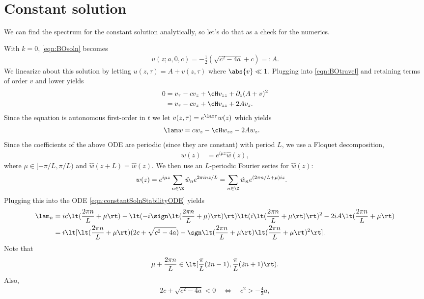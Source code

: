 \documentclass[a4paper,10pt]{article}
\begin{document}
\section{Constant solution}
We can find the spectrum for the constant solution analytically, so let's do
that as a check for the numerics.

With $k=0$, \eqref{eqn:BOsoln} becomes
\begin{align}
  u(z; a,0,c) = -\frac12 (\sqrt{c^2-4a}+c) =: A.
\end{align}
We linearize about this solution by letting $u(z,\tau)= A + v(z,\tau)$ where
$\abs{v}\ll1$. Plugging into \eqref{eqn:BOtravel} and retaining terms of order
$v$ and lower yields
\begin{align}
  0 &= v_\tau -c v_z + \cH v_{zz} + \partial_z(A+v)^2\\
  &= v_\tau -cv_z + \cH v_{zz} + 2A v_z.
\end{align}
Since the equation is autonomous first-order in $t$ we let $v(z,\tau) = e^{\lam
\tau}w(z)$ which yields
\begin{align}
  \lam w &= c w_z -\cH w_{zz} - 2 A w_z.\label{eqn:constantSolnStabilityODE}
\end{align}
Since the coefficients of the above ODE are periodic (since they are constant)
with period $L$, we use a Floquet decomposition,
\begin{align}
  w(z) &= e^{i\mu z}\hat w(z) ,
\end{align}
where $\mu \in [-\pi/L, \pi/L)$ and $\hat w(z+L) = \hat w(z)$. We then use an
  $L$-periodic Fourier series for $\hat w(z)$:
\begin{align}
  w(z) &= e^{i\mu z} \sum_{n\in \Z} \hat w_n e^{2\pi i n z/L} = \sum_{n\in
  \Z}\hat w_n e^{(2\pi n/L + \mu)iz}.
\end{align}
Plugging this into the ODE \eqref{eqn:constantSolnStabilityODE} yields
\begin{align}
  \lam_n &= ic \lt(\frac{2\pi n}{L} + \mu\rt) - \lt(-i\sign\lt(\frac{2\pi
  n}{L}+\mu)\rt)\rt)\lt(i\lt(\frac{2\pi n}{L}+\mu\rt)\rt)^2 - 2iA \lt(\frac{2\pi
  n}{L}+\mu\rt)\\
  &= i\lt[ \lt(\frac{2\pi n}{L}+\mu\rt)(2c + \sqrt{c^2-4a}) - \sgn\lt(\frac{2\pi
  n}{L}+\mu\rt)\lt(\frac{2\pi n}{L}+\mu\rt)^2\rt].
\end{align}
Note that
\begin{align}
  \mu + \frac{2\pi n}{L} \in \lt[\frac \pi L (2n-1), \frac \pi L(2n+1)\rt).
\end{align}
Also,
\begin{align}
  2c + \sqrt{c^2-4a}<0 \quad \Leftrightarrow \quad c^2 > -\frac43 a,
\end{align}
\end{document}
